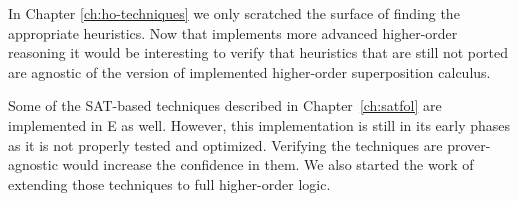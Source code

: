 In Chapter \ref{ch:ho-techniques} we only scratched the surface of finding the
appropriate heuristics. Now that \ehohii{} implements more advanced higher-order
reasoning it would be interesting to verify that heuristics that are still not
ported are agnostic of the version of implemented higher-order superposition
calculus. 

Some of the SAT-based techniques described in Chapter~\ref{ch:satfol} are
implemented in E as well. However, this implementation is still in its early
phases as it is not properly tested and optimized. Verifying the techniques are
prover-agnostic would increase the confidence in them. We also started the work
of extending those techniques to full higher-order logic.
